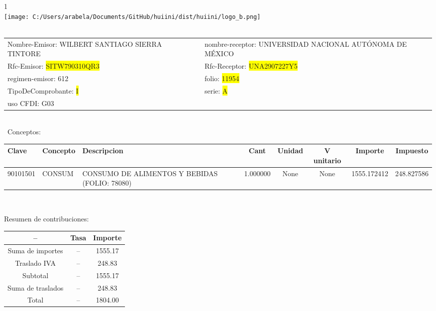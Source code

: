 \documentclass{article}
\begin{document}
\hspace{18cm} 1\\
\texttt{[image: C:/Users/arabela/Documents/GitHub/huiini/dist/huiini/logo\_b.png]}
\bigskip\\\
\begin{tabular}{p{11cm}p{1cm}p{8cm}}

Nombre-Emisor: WILBERT SANTIAGO SIERRA TINTORE && nombre-receptor: UNIVERSIDAD NACIONAL AUTÓNOMA DE MÉXICO\\

Rfc-Emisor: \colorbox{yellow}{ SITW790310QR3 } & & Rfc-Receptor: \colorbox{yellow}{ UNA2907227Y5 }\\

regimen-emisor: 612 & & folio: \colorbox{yellow}{ 11954 }\\

TipoDeComprobante: \colorbox{yellow}{ I } & & serie: \colorbox{yellow}{ A }\\

uso CFDI: G03\\



\end{tabular}
\bigskip\bigskip\bigskip\\\
Conceptos:\\
\begin{tabular}{|p{1.5cm}|p{3.6cm}|p{3.6cm}|c|c|c|c|c|}
\hline
Clave & Concepto & Descripcion & Cant & Unidad & V unitario & Importe & Impuesto \\
\hline

90101501 & CONSUM & CONSUMO DE ALIMENTOS Y BEBIDAS (FOLIO: 78080) & 1.000000 & None & None & 1555.172412 &  248.827586 \\
\hline

\end{tabular}\\
\bigskip
\begin{center}
Resumen de contribuciones:\\
\bigskip
\begin{tabular}{|c|c|c|}
\hline
 -- & Tasa & Importe\\
\hline

Suma de importes & -- & 1555.17 \\
\hline

Traslado IVA & -- & 248.83 \\
\hline

Subtotal  & -- & 1555.17 \\
\hline

Suma de traslados & -- & 248.83 \\
\hline

Total  & -- & 1804.00 \\
\hline

\end{tabular}
\end{center}
\end{document}
